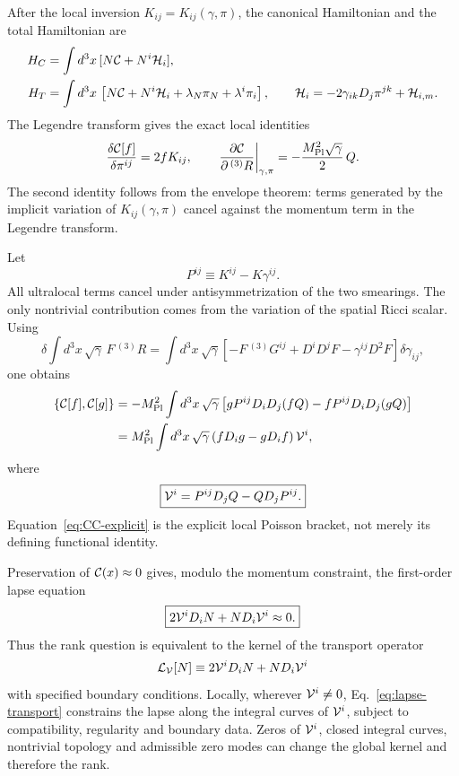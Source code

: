 \documentclass[11pt,a4paper]{article}
\begin{document}
After the local inversion \(K_{ij}=K_{ij}(\gamma,\pi)\), the canonical
Hamiltonian and the total Hamiltonian are
\begin{align}
 H_C&=\int d^3x\,[N{\cal C}+N^i{\cal H}_i],\\
 H_T&=\int d^3x\,
 \left[N{\cal C}+N^i{\cal H}_i+\lambda_N\pi_N+\lambda^i\pi_i\right],
 \qquad
 {\cal H}_i=-2\gamma_{ik}D_j\pi^{jk}+{\cal H}_{i,m}.
\end{align}
The Legendre transform gives the exact local identities
\begin{equation}
 \frac{\delta{\cal C}[f]}{\delta\pi^{ij}}=2fK_{ij},
 \qquad
 \left.\frac{\partial{\cal C}}{\partial\,{}^{(3)}R}\right|_{\gamma,\pi}
 =-\frac{M_{\rm Pl}^2\sqrt{\gamma}}{2}\,Q .
 \label{eq:envelope-identities}
\end{equation}
The second identity follows from the envelope theorem: terms generated by the
implicit variation of \(K_{ij}(\gamma,\pi)\) cancel against the momentum term in
the Legendre transform.

Let
\begin{equation}
 P^{ij}\equiv K^{ij}-K\gamma^{ij}.
\end{equation}
All ultralocal terms cancel under antisymmetrization of the two smearings.  The
only nontrivial contribution comes from the variation of the spatial Ricci
scalar.  Using
\begin{equation}
 \delta\!\int d^3x\,\sqrt{\gamma}\,F\,{}^{(3)}R
 =
 \int d^3x\,\sqrt{\gamma}
 \left[-F\,{}^{(3)}G^{ij}
 +D^iD^jF-\gamma^{ij}D^2F\right]\delta\gamma_{ij},
\end{equation}
one obtains
\begin{align}
 \{{\cal C}[f],{\cal C}[g]\}
 &=-M_{\rm Pl}^2\int d^3x\,\sqrt{\gamma}
 \left[gP^{ij}D_iD_j(fQ)-fP^{ij}D_iD_j(gQ)\right] \nonumber\\
 &=M_{\rm Pl}^2\int d^3x\,\sqrt{\gamma}\,
 (fD_i g-gD_i f)\,{\cal V}^i ,
 \label{eq:CC-explicit}
\end{align}
where
\begin{equation}
 \boxed{
 {\cal V}^i=P^{ij}D_jQ-QD_jP^{ij}.
 }
 \label{eq:V-vector}
\end{equation}
Equation~\eqref{eq:CC-explicit} is the explicit local Poisson bracket, not merely
its defining functional identity.

Preservation of \({\cal C}(x)\approx0\) gives, modulo the momentum constraint,
the first-order lapse equation
\begin{equation}
 \boxed{
 2{\cal V}^iD_iN+N D_i{\cal V}^i\approx0 .
 }
 \label{eq:lapse-transport}
\end{equation}
Thus the rank question is equivalent to the kernel of the transport operator
\begin{equation}
 {\cal L}_{\cal V}[N]\equiv
 2{\cal V}^iD_iN+N D_i{\cal V}^i
\end{equation}
with specified boundary conditions.  Locally, wherever \({\cal V}^i\neq0\), Eq.~\eqref{eq:lapse-transport}
constrains the lapse along the integral curves of \({\cal V}^i\), subject to
compatibility, regularity and boundary data. Zeros of \({\cal V}^i\), closed
integral curves, nontrivial topology and admissible zero modes can change the
global kernel and therefore the rank.
\end{document}
